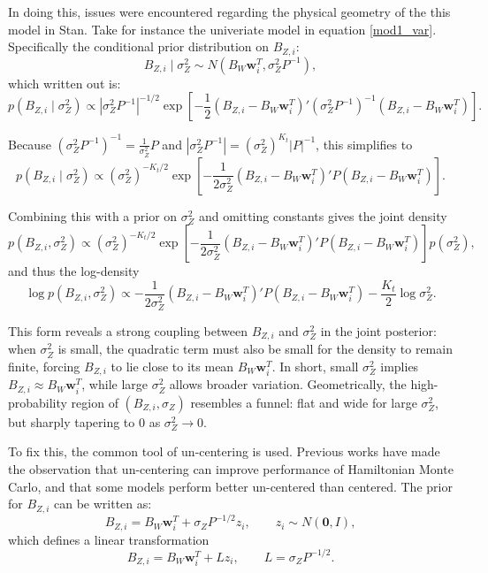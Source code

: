 In doing this, issues were encountered regarding the physical geometry of the this model in Stan.  
Take for instance the univeriate model in equation \ref{mod1_var}.  Specifically the conditional prior distribution on \(B_{Z,i}\):
\[
B_{Z,i} \mid \sigma_Z^2 \sim N(B_W \boldsymbol{w}_i^T, \sigma_Z^2 P^{-1}),
\]
which written out is:
\[
p(B_{Z,i} \mid \sigma_Z^2) \propto |\sigma_Z^2 P^{-1}|^{-1/2}
\exp\left[
-\frac{1}{2}(B_{Z,i}-B_W \boldsymbol{w}_i^T)'(\sigma_Z^2 P^{-1})^{-1}(B_{Z,i}-B_W \boldsymbol{w}_i^T)
\right].
\]

Because $(\sigma_Z^2 P^{-1})^{-1} = \tfrac{1}{\sigma_Z^2}P$ and $|\sigma_Z^2 P^{-1}| = (\sigma_Z^2)^{K_t}|P|^{-1}$, this simplifies to
\[
p(B_{Z,i} \mid \sigma_Z^2)
\propto
(\sigma_Z^2)^{-K_t/2}
\exp\left[
-\frac{1}{2\sigma_Z^2}
(B_{Z,i}-B_W \boldsymbol{w}_i^T)'P(B_{Z,i}-B_W \boldsymbol{w}_i^T)
\right].
\]

Combining this with a prior on $\sigma_Z^2$ and omitting constants gives the joint density
\[
p(B_{Z,i}, \sigma_Z^2)
\propto
(\sigma_Z^2)^{-K_t/2}\exp\left[-\frac{1}{2\sigma_Z^2}
(B_{Z,i}-B_W \boldsymbol{w}_i^T)'P(B_{Z,i}-B_W \boldsymbol{w}_i^T)
\right]p(\sigma_Z^2),
\]
and thus the log-density
\[
\log p(B_{Z,i}, \sigma_Z^2)\propto -\frac{1}{2\sigma_Z^2}
(B_{Z,i}-B_W \boldsymbol{w}_i^T)'P(B_{Z,i}-B_W \boldsymbol{w}_i^T)
-\frac{K_t}{2}\log\sigma_Z^2.
\]

This form reveals a strong coupling between $B_{Z,i}$ and $\sigma_Z^2$ in the joint posterior: when $\sigma_Z^2$ is small, 
the quadratic term must also be small for the density to remain finite, forcing $B_{Z,i}$ to lie close to its 
mean $B_W \boldsymbol{w}_i^T$.  In short, small $\sigma_Z^2$ implies $B_{Z,i} \approx B_W \boldsymbol{w}_i^T$, 
while large $\sigma_Z^2$ allows broader variation.  Geometrically, the high-probability region of $(B_{Z,i},\sigma_Z)$ 
resembles a funnel: flat and wide for large $\sigma_Z^2$, but sharply tapering to 0 as $\sigma_Z^2 \to 0$.

To fix this, the common tool of un-centering is used.  Previous works have made the observation that un-centering can 
improve performance of Hamiltonian Monte Carlo\cite{betancourt_hamiltonian_2013}, and that some models perform better un-centered 
than centered\cite{papaspiliopoulos_general_2007}.  The prior for \(B_{Z,i}\) can be written as:
\[
B_{Z,i} = B_W \boldsymbol{w}_i^T + \sigma_Z P^{-1/2} z_i, \qquad z_i \sim N(\mathbf{0}, I),
\]
which defines a linear transformation
\[
B_{Z,i} = B_W \boldsymbol{w}_i^T + L z_i,\qquad L = \sigma_Z P^{-1/2}.
\]

